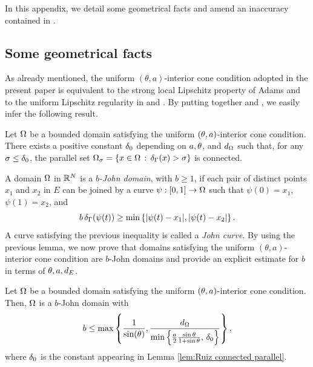 \documentclass[a4paper,10pt]{amsart}
\numberwithin{equation}{section}
\begin{document}
In this appendix, we detail some geometrical facts and amend an inaccuracy contained in \cite{MP6}.

\subsection{Some geometrical facts}
As already mentioned, the uniform $(\theta, a )$-interior cone condition adopted in the present paper is equivalent to 
%
%
the strong local Lipschitz property of Adams \cite[p. 66]{Ad} and to the uniform Lipschitz regularity in \cite[Section III]{Ch} and \cite[Definition 2.1]{Ru}.
By putting together \cite[Proposition 4.1 in the Appendix]{Ru} and \cite[Proposition III.1]{Ch}, we easily infer the following result.


\begin{lem}%
\label{lem:Ruiz connected parallel}
Let $\Omega$ be a bounded domain
satisfying the uniform $(\theta, a )$-interior cone condition.
	There exists a positive constant $\delta_0$ depending on $a, \theta$, and $d_\Omega$ such that, for any $\sigma \le \delta_0$, the parallel set $\Omega_\sigma=\left\{ x\in \Omega  \, : \, \delta_{\Gamma }(x) > \sigma \right\}$ is connected.
\end{lem} 

A domain $\Omega$ in $\mathbb{R}^N$ is a {\it $b$-John domain}, with $b \ge 1$, if each pair of distinct points $x_1$ and $x_2$ in $E$ can be joined by a curve $\psi: [0,1] \to \Omega$ such that
$\psi(0)=x_1$, $\psi(1)=x_2$, and
\begin{equation*}
	b\,\delta_{\Gamma} (\psi(t)) \ge \min\left\{ |\psi(t) - x_1|, |\psi(t) - x_2| \right\}.
\end{equation*}
A curve satisfying the previous inequality is called a {\it John curve}.
By using the previous lemma, we now prove that domains satisfying the uniform $(\theta, a )$-interior cone condition are $b$-John domains and provide an explicit estimate for $b$ in terms of $\theta, a, d_E$.

\begin{lem}\label{lem:cone condition strong implies John}
	Let $\Omega$ be a bounded domain satisfying the uniform $(\theta, a )$-interior cone condition. Then, $\Omega$ is a $b$-John domain with
	$$
	b \le \max \left\{ \frac{1}{\sin(\theta)} , \frac{d_\Omega}{\min \left\{ \frac{a}{2} \frac{\sin \theta}{1+ \sin \theta} , \, \delta_0 \right\} } \right\} ,
	$$
	where $\delta_0$ is the constant appearing in Lemma \ref{lem:Ruiz connected parallel}.
\end{lem}
\end{document}
